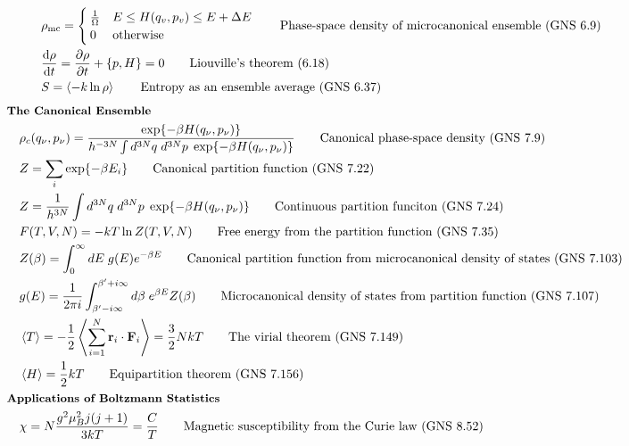 \documentclass[10pt]{article}
\newcommand{\ve}[1]{\boldsymbol{\mathbf{#1}}}
\newcommand{\tder}[2]{\frac{\dd #1}{\dd #2}}
\newcommand{\pder}[2]{\frac{\partial #1}{\partial #2}}
\begin{document}
\begin{multicols}{2}
\begin{align*}
		& \rho_{\text{mc}} = \begin{cases}
			\frac{1}{\Omega} & E \leq H(q_v,p_v) \leq E + \Delta E \\
			0	& \text{otherwise} \\
		\end{cases}	\tag*{Phase-space density of microcanonical ensemble (GNS 6.9)} \\
		& \tder{\rho}{t} = \pder{\rho}{t} + \{ p,H \} = 0	\tag*{Liouville's theorem (6.18)} \\
		& S = \expval{-k \ln \rho}	\tag*{Entropy as an ensemble average (GNS 6.37)} \\
	\end{align*} \newpage
	\setlength{\abovedisplayskip}{-25pt}
	\setlength{\belowdisplayskip}{-10pt}
	\setlength{\abovedisplayshortskip}{0pt}
	\setlength{\belowdisplayshortskip}{0pt}
	\begin{align*} 
	& \small \hspace{-10pt} \textbf{The Canonical Ensemble} \small \\
		& \rho_c(q_\nu,p_\nu) = \frac{\exp\{ - \beta H(q_\nu,p_\nu ) \}}{h^{-3N} \int d^{3N}q \; d^{3N}p \; \exp \{ -\beta H(q_\nu, p_\nu) \}}	\tag*{Canonical phase-space density (GNS 7.9)} \\
		& Z = \sum_i \exp \{ - \beta E_i \}	\tag*{Canonical partition function (GNS 7.22)} \\
		& Z = \frac{1}{h^{3N}} \int d^{3N}q \; d^{3N}p \; \exp{-\beta H(q_\nu,p_\nu)}	\tag*{Continuous partition funciton (GNS 7.24)} \\
		& F(T,V,N) = -kT \ln Z(T,V,N)	\tag*{Free energy from the partition function (GNS 7.35)} \\
		& Z(\beta) = \int_0^\infty dE \; g(E) e^{-\beta E}	\tag*{Canonical partition function from microcanonical density of states (GNS 7.103)} \\
		& g(E) = \frac{1}{2 \pi i} \int_{\beta'-i \infty}^{\beta'+i \infty} d \beta \; e^{\beta E} Z(\beta)	\tag*{Microcanonical density of states from partition function (GNS 7.107)} \\
		& \expval{T} = - \frac{1}{2} \expval{\sum_{i=1}^N \ve{r}_i \cdot \ve{F}_i} = \frac{3}{2} NkT	\tag*{The virial theorem (GNS 7.149)} \\
		& \expval{H} = \frac{1}{2} kT	\tag*{Equipartition theorem (GNS 7.156)} \\
	& \small \hspace{-10pt} \textbf{Applications of Boltzmann Statistics} \small \\
		& \chi =N \frac{g^2 \mu_B^2 j(j+1)}{3kT} = \frac{C}{T}	\tag*{Magnetic susceptibility from the Curie law (GNS 8.52)} \\

\end{align*}
\end{multicols}
\end{document}
